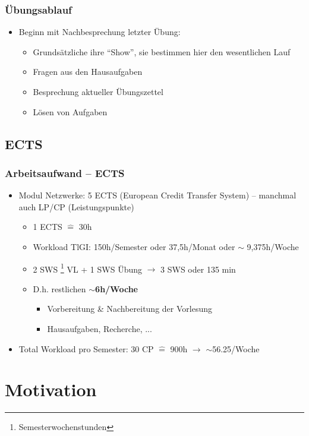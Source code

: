 \documentclass[xcolor=dvipsnames,aspectratio=169]{beamer}
\begin{document}
\begin{frame}
	\frametitle{Übungsablauf}
	\begin{itemize}
		\item Beginn mit Nachbesprechung letzter Übung:
		\begin{itemize}
			\item Grundsätzliche ihre \enquote{Show}, sie bestimmen hier den wesentlichen Lauf
			\item Fragen aus den Hausaufgaben
			\item Besprechung aktueller Übungszettel
			\item Lösen von Aufgaben
		\end{itemize}
	\end{itemize}
\end{frame}

\subsection{ECTS}
\begin{frame}
	\frametitle{Arbeitsaufwand -- ECTS}
	\begin{itemize}
		\item Modul Netzwerke: 5 ECTS (European Credit Transfer System) -- manchmal auch LP/CP (Leistungspunkte)
			\begin{itemize}
				\item 1 ECTS $\widehat{=}$ 30h
				\item Workload TlGI: 150h/Semester oder 37,5h/Monat oder $\sim$ 9,375h/Woche
				\item 2 SWS \footnote{Semesterwochenstunden} VL + 1 SWS Übung $\rightarrow$ 3 SWS oder 135 min
				\item D.h. restlichen $\sim$\textbf{6h/Woche}
				\begin{itemize}
					\item Vorbereitung \& Nachbereitung der Vorlesung
					\item Hausaufgaben, Recherche, ...
				\end{itemize}
			\end{itemize}
			\item Total Workload pro Semester: 30 CP $\widehat{=}$ 900h $\rightarrow$  $\sim$56.25/Woche
	\end{itemize}
\end{frame}

\section{Motivation}
\end{document}
